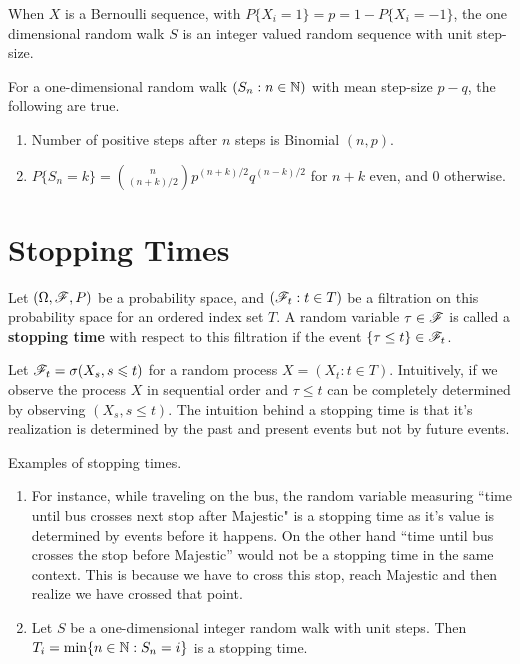 \documentclass[a4paper,10pt,english]{article}
\begin{document}
When $X$ is a Bernoulli sequence, with $P\{X_i = 1\} = p = 1 - P\{X_i = -1\}$, 
the one dimensional random walk $S$ is an integer valued random sequence with unit step-size. 
\begin{thm} 
For a one-dimensional random walk $(S_n: n \in \mathbb{N})$ with mean step-size $p-q$, the following are true. 
\begin{enumerate}[i\_]
\item Number of positive steps after $n$ steps is Binomial $(n,p)$. 
\item $P\{S_n = k\} = \binom{n}{(n+k)/2}p^{(n+k)/2}q^{(n-k)/2}$ for $n+k$ even, and $0$ otherwise. 
\end{enumerate}
\end{thm}

\section{Stopping Times}
Let $(\Omega, \mathscr{F}, P)$ be a probability space, and $(\mathscr{F}_t: t \in T)$ be a filtration on this probability space for an ordered index set $T$.   
A random variable $\tau \in \mathscr{F}$ is called a \textbf{stopping time} with respect to this filtration if the event $\{\tau \leq t\} \in \mathscr{F}_t$. 

Let $\mathscr{F}_t = \sigma(X_s, s \leqslant t)$ for a random process $X = (X_t : t \in T)$. 
Intuitively, if we observe the process $X$ in sequential order and $\tau \le t$ can be completely determined by observing $(X_s, s \le t)$. 
The intuition behind a stopping time is that it's realization is determined by the past and present events but not by future events. 
\begin{shaded*}
\begin{exmp} Examples of stopping times.
\begin{enumerate}
\item For instance, while traveling on the bus, the random variable measuring ``time until bus crosses next stop after Majestic" is a stopping time as it's value is determined by events before it happens. 
On the other hand ``time until bus crosses the stop before Majestic'' would not be a stopping time  in the same context. 
This is because we have to cross this stop, reach Majestic and then realize we have crossed that point. 
 \item Let $S$ be a one-dimensional integer random walk with unit steps. 
Then $T_i = \min \{n \in \mathbb{N}: S_n= i\}$ is a stopping time.
\end{enumerate}
\end{exmp}
\end{shaded*}
\end{document}
